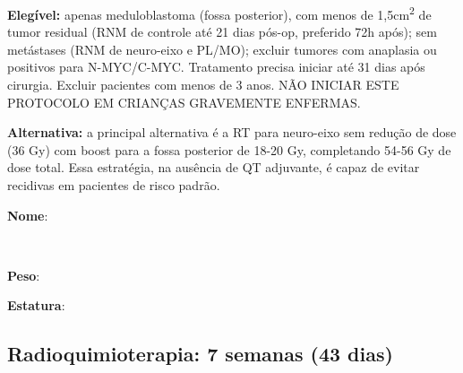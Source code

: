 \documentclass[11pt,a4paper,oldfontcommands]{memoir}
\def\entrywithlabel[#1]#2{\parbox{#1}{{\small #2:} \hrulefill}}
\begin{document}
\textbf{Elegível:} apenas meduloblastoma (fossa posterior), com menos de 1,5cm\textsuperscript{2} de tumor residual (RNM de controle até 21 dias pós-op, preferido 72h após); sem metástases (RNM de neuro-eixo e PL/MO); excluir tumores com anaplasia ou positivos para N-MYC/C-MYC. Tratamento precisa iniciar até 31 dias após cirurgia. Excluir pacientes com menos de 3 anos. NÃO INICIAR ESTE PROTOCOLO EM CRIANÇAS GRAVEMENTE ENFERMAS.

\textbf{Alternativa:} a principal alternativa é a RT para neuro-eixo sem redução de dose (36 Gy) com boost para a fossa posterior de 18-20 Gy, completando 54-56 Gy de dose total. Essa estratégia, na ausência de QT adjuvante, é capaz de evitar recidivas em pacientes de risco padrão.
\\[0.4cm]
\entrywithlabel[1\hsize]{\textbf{Nome}}\hfill
\\[0.3cm]
\entrywithlabel[.45\hsize]{\textbf{Peso}}\hfill  \entrywithlabel[.45\hsize]{\textbf{Estatura}}

\subsection{Radioquimioterapia: 7 semanas (43 dias)}
\end{document}
